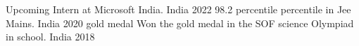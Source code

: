 


\begin{cvhonors}

    \cvhonor
    {Upcoming Intern} %
    {at Microsoft India.} %
    {India} %
    {2022} %
  \cvhonor
    {98.2 percentile} %
    {percentile in Jee Mains.} %
    {India} %
    {2020} %
  \cvhonor
    {gold medal}%
    {Won the gold medal in the SOF science Olympiad in school.} %
    {India} %
    {2018} %
\end{cvhonors}